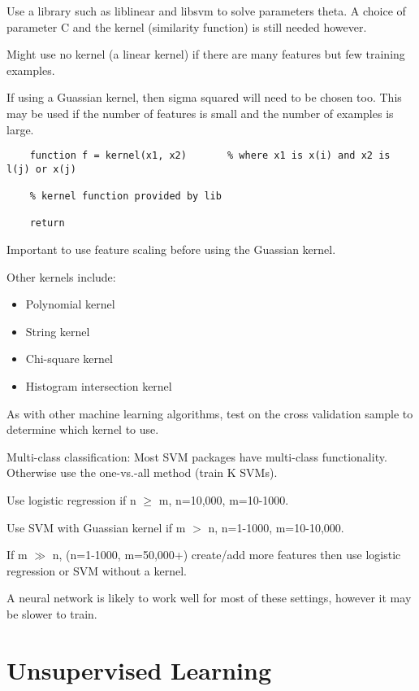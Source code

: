 \documentclass[12pt, a4paper]{article}
\begin{document}
{    Use a library such as liblinear and libsvm to solve parameters theta.
    A choice of parameter C and the kernel (similarity function) is still
    needed however. 

    Might use no kernel (a linear kernel) if there are many features but few
    training examples. 

    If using a Guassian kernel, then sigma squared will need to be chosen too.
    This may be used if the number of features is small and the number of 
    examples is large. 

    \begin{lstlisting}
    function f = kernel(x1, x2)       % where x1 is x(i) and x2 is l(j) or x(j)

    % kernel function provided by lib

    return
    \end{lstlisting}

    Important to use feature scaling before using the Guassian kernel. 

    Other kernels include:
    \vspace{-1em}
    \begin{itemize}
      \item Polynomial kernel
      \item String kernel
      \item Chi-square kernel
      \item Histogram intersection kernel
    \end{itemize}

    As with other machine learning algorithms, test on the cross validation
    sample to determine which kernel to use. 

    Multi-class classification: Most SVM packages have multi-class 
    functionality. Otherwise use the one-vs.-all method (train K SVMs).

    Use logistic regression if n $\geq$ m, n=10,000, m=10-1000.

    Use SVM with Guassian kernel if m $>$ n, n=1-1000, m=10-10,000.

    If m $\gg$ n, (n=1-1000, m=50,000+)  create/add more features then use 
    logistic regression or SVM without a kernel.

    A neural network is likely to work well for most of these settings, 
    however it may be slower to train.

  \newpage

\section{Unsupervised Learning}

}
\end{document}
